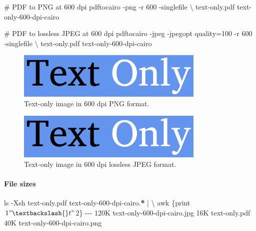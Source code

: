\documentclass[
  11pt,
  british,
  a4paper,
]{article}
\newenvironment{Shaded}{\begin{snugshade}}{\end{snugshade}}
\newcommand{\AttributeTok}[1]{\textcolor[rgb]{0.80,0.80,0.80}{#1}}
\newcommand{\CommentTok}[1]{\textcolor[rgb]{0.50,0.62,0.50}{#1}}
\newcommand{\DataTypeTok}[1]{\textcolor[rgb]{0.87,0.87,0.75}{#1}}
\newcommand{\ExtensionTok}[1]{\textcolor[rgb]{0.80,0.80,0.80}{#1}}
\newcommand{\FunctionTok}[1]{\textcolor[rgb]{0.94,0.94,0.56}{#1}}
\newcommand{\KeywordTok}[1]{\textcolor[rgb]{0.94,0.87,0.69}{#1}}
\newcommand{\NormalTok}[1]{\textcolor[rgb]{0.80,0.80,0.80}{#1}}
\newcommand{\PreprocessorTok}[1]{\textcolor[rgb]{1.00,0.81,0.69}{\textbf{#1}}}
\newcommand{\StringTok}[1]{\textcolor[rgb]{0.80,0.58,0.58}{#1}}
\begin{document}
\begin{Shaded}
\begin{Highlighting}[]
\CommentTok{\# PDF to PNG at 600 dpi}
\ExtensionTok{pdftocairo} \AttributeTok{{-}png} \AttributeTok{{-}r}\NormalTok{ 600 }\AttributeTok{{-}singlefile} \DataTypeTok{\textbackslash{}}
\NormalTok{text{-}only.pdf text{-}only{-}600{-}dpi{-}cairo}

\CommentTok{\# PDF to lossless JPEG at 600 dpi}
\ExtensionTok{pdftocairo} \AttributeTok{{-}jpeg} \AttributeTok{{-}jpegopt}\NormalTok{ quality=100 }\AttributeTok{{-}r}\NormalTok{ 600 }\AttributeTok{{-}singlefile} \DataTypeTok{\textbackslash{}}
\NormalTok{text{-}only.pdf text{-}only{-}600{-}dpi{-}cairo}
\end{Highlighting}
\end{Shaded}

\begin{figure}
\hypertarget{fig:text-only-png-cairo}{%
\centering
\includegraphics[width=0.8\textwidth,height=\textheight]{images/text-only-600-dpi-cairo.png}
\caption{Text-only image in 600 dpi PNG
format.}\label{fig:text-only-png-cairo}
}
\end{figure}

\begin{figure}
\hypertarget{fig:text-only-jpg-cairo}{%
\centering
\includegraphics[width=0.8\textwidth,height=\textheight]{images/text-only-600-dpi-cairo.jpg}
\caption{Text-only image in 600 dpi lossless JPEG
format.}\label{fig:text-only-jpg-cairo}
}
\end{figure}

\hypertarget{file-sizes}{%
\paragraph{File sizes}\label{file-sizes}}

\begin{Shaded}
\begin{Highlighting}[]
\FunctionTok{ls} \AttributeTok{{-}Xsh}\NormalTok{ text{-}only.pdf text{-}only{-}600{-}dpi{-}cairo.}\PreprocessorTok{*} \KeywordTok{|} \DataTypeTok{\textbackslash{}}
\FunctionTok{awk} \StringTok{\textquotesingle{}\{print $1 "\textbackslash{}t" $2\}\textquotesingle{}}
\ExtensionTok{{-}{-}{-}}
\ExtensionTok{120K}\NormalTok{    text{-}only{-}600{-}dpi{-}cairo.jpg}
\ExtensionTok{16K}\NormalTok{     text{-}only.pdf}
\ExtensionTok{40K}\NormalTok{     text{-}only{-}600{-}dpi{-}cairo.png}
\end{Highlighting}
\end{Shaded}
\end{document}
